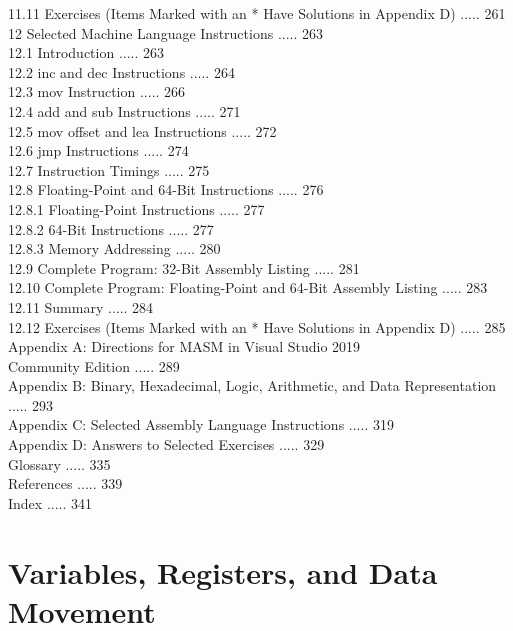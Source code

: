 \documentclass[10pt]{book}
\begin{document}
11.11 Exercises (Items Marked with an * Have Solutions in Appendix D) ..... 261\\
12 Selected Machine Language Instructions ..... 263\\
12.1 Introduction ..... 263\\
12.2 inc and dec Instructions ..... 264\\
12.3 mov Instruction ..... 266\\
12.4 add and sub Instructions ..... 271\\
12.5 mov offset and lea Instructions ..... 272\\
12.6 jmp Instructions ..... 274\\
12.7 Instruction Timings ..... 275\\
12.8 Floating-Point and 64-Bit Instructions ..... 276\\
12.8.1 Floating-Point Instructions ..... 277\\
12.8.2 64-Bit Instructions ..... 277\\
12.8.3 Memory Addressing ..... 280\\
12.9 Complete Program: 32-Bit Assembly Listing ..... 281\\
12.10 Complete Program: Floating-Point and 64-Bit Assembly Listing ..... 283\\

12.11 Summary ..... 284\\
12.12 Exercises (Items Marked with an * Have Solutions in Appendix D) ..... 285\\
Appendix A: Directions for MASM in Visual Studio 2019\\
Community Edition ..... 289\\
Appendix B: Binary, Hexadecimal, Logic, Arithmetic, and Data Representation ..... 293\\
Appendix C: Selected Assembly Language Instructions ..... 319\\
Appendix D: Answers to Selected Exercises ..... 329\\
Glossary ..... 335\\
References ..... 339\\
Index ..... 341

\chapter{Variables, Registers, and Data Movement}
\end{document}
